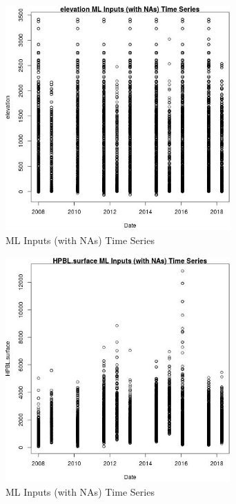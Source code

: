 \begin{figure} 
\centering  
\includegraphics[width=0.77\textwidth]{Code_Outputs/Report_ML_input_PM25_Step4_part_e_de_duplicated_aves_compiled_2019-05-18wNAs_elevationvDate.jpg} 
\caption{\label{fig:Report_ML_input_PM25_Step4_part_e_de_duplicated_aves_compiled_2019-05-18wNAselevationvDate}ML Inputs (with NAs) Time Series} 
\end{figure} 
 

\begin{figure} 
\centering  
\includegraphics[width=0.77\textwidth]{Code_Outputs/Report_ML_input_PM25_Step4_part_e_de_duplicated_aves_compiled_2019-05-18wNAs_HPBLsurfacevDate.jpg} 
\caption{\label{fig:Report_ML_input_PM25_Step4_part_e_de_duplicated_aves_compiled_2019-05-18wNAsHPBLsurfacevDate}ML Inputs (with NAs) Time Series} 
\end{figure} 
 

